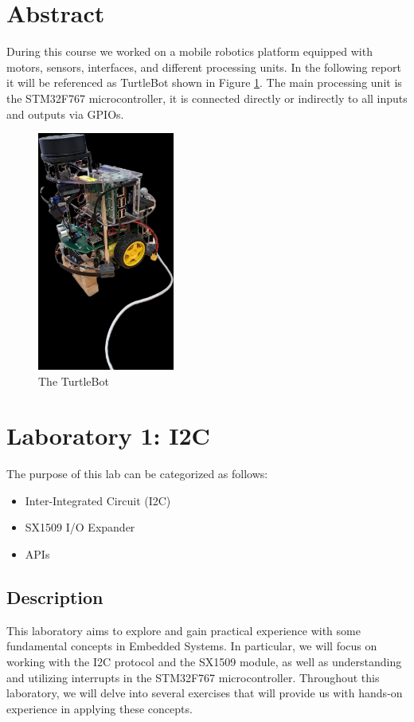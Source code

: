 \documentclass[english]{article}
\begin{document}
\begin{titlepage}
\end{titlepage}

\tableofcontents
\newpage
\section{Abstract}
During this course we worked on a mobile robotics platform equipped with motors, sensors, interfaces, and different processing units. In the following report it will be referenced as TurtleBot shown in Figure \ref{fig:turtlebot}. The main processing unit is the STM32F767 microcontroller, it is connected directly or indirectly to all inputs and outputs via GPIOs.
\begin{figure}[!h]
	\centering
	\includegraphics[width=0.4\textwidth]{figures/turtlebot.jpg}
	\caption{The TurtleBot}
	\label{fig:turtlebot}
\end{figure}

\newpage
\section{Laboratory 1: I2C}
The purpose of this lab can be categorized as follows:
\begin{itemize}
    \item Inter-Integrated Circuit (I2C)
    \item SX1509 I/O Expander
    \item APIs
\end{itemize}

\subsection{Description}
This laboratory aims to explore and gain practical experience with some fundamental concepts in Embedded Systems.
 In particular, we will focus on working with the I2C protocol and the SX1509 module, as well as understanding 
and utilizing interrupts in the STM32F767 microcontroller. Throughout this laboratory, we will delve into several exercises that will provide us with hands-on experience in applying these concepts.
\end{document}
